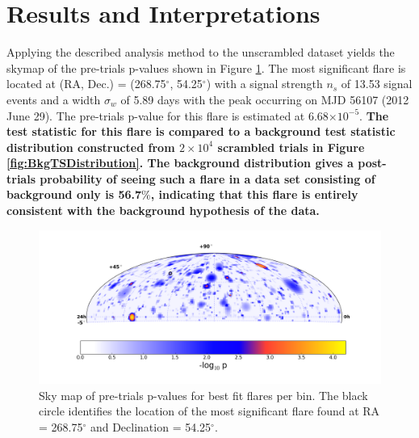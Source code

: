 \documentclass[manuscript]{aastex}
\begin{document}
\section{Results and Interpretations}
Applying the described analysis method to the unscrambled dataset yields the skymap of the pre-trials p-values shown in Figure \ref{fig:RealSkyMap}. The most significant flare is located at (RA, Dec.) = (268.75$^{\circ}$, 54.25$^{\circ}$) with a signal strength $n_s$ of 13.53 signal events and a width $\sigma_w$ of 5.89 days with the peak occurring on MJD 56107 (2012 June 29). The pre-trials p-value for this flare is estimated at 6.68$\times 10^{-5}$. \textbf{The test statistic for this flare is compared to a background test statistic distribution constructed from $2 \times 10^4$ scrambled trials in Figure \ref{fig:BkgTSDistribution}. The background distribution gives a post-trials probability of seeing such a flare in a data set consisting of background only is 56.7$\%$, indicating that this flare is entirely consistent with the background hypothesis of the data.}
\begin{figure}[ht]
  \begin{center}
    \includegraphics[width=1.0\textwidth,keepaspectratio]{plots/RealSkyMap_FineCut.png}
  \end{center}
  \caption[Results Sky Map]{Sky map of pre-trials p-values for best fit flares per bin. The black circle identifies the location of the most significant flare found at RA = 268.75$^\circ$ and Declination = 54.25$^\circ$.}
  \label{fig:RealSkyMap}
\end{figure}
\end{document}
